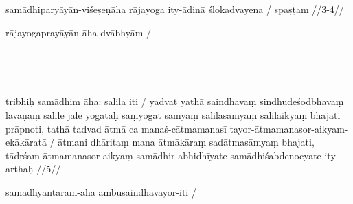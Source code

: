 \documentclass[12pt,parskip]{scrartcl}
\begin{document}
\begin{ekdosis}
  \begin{cjyo}[4.3]
    samādhiparyāyān-viśeṣeṇāha rājayoga ity-ādinā ślokadvayena /
    spaṣṭam //3-4//
  \end{cjyo}

  \begin{cpra}[8.50]
    rājayogaprayāyān-āha dvābhyām /
  \end{cpra}
  
  \begin{tlg}[4.4][8.51]
    \\
  \end{tlg}

  \begin{tlg}[4.5][7.4]
    \\
  \end{tlg}

  \begin{cjyo}[4.5]
    tribhiḥ samādhim āha: salila iti /
    yadvat yathā saindhavaṃ sindhudeśodbhavaṃ lavaṇaṃ salile jale yogataḥ saṃyogāt sāmyaṃ salilasāmyaṃ salilaikyaṃ bhajati prāpnoti, tathā tadvad ātmā ca manaś-cātmamanasī tayor-ātmamanasor-aikyam-ekākāratā /
    ātmani dhāritaṃ mana ātmākāraṃ sadātmasāmyaṃ bhajati, tādṛśam-ātmamanasor-aikyaṃ samādhir-abhidhīyate samādhiśabdenocyate ity-arthaḥ //5//
  \end{cjyo}

  \begin{cpra}[8.51]
    samādhyantaram-āha ambusaindhavayor-iti /
  \end{cpra}
  
\end{ekdosis}
\end{document}
